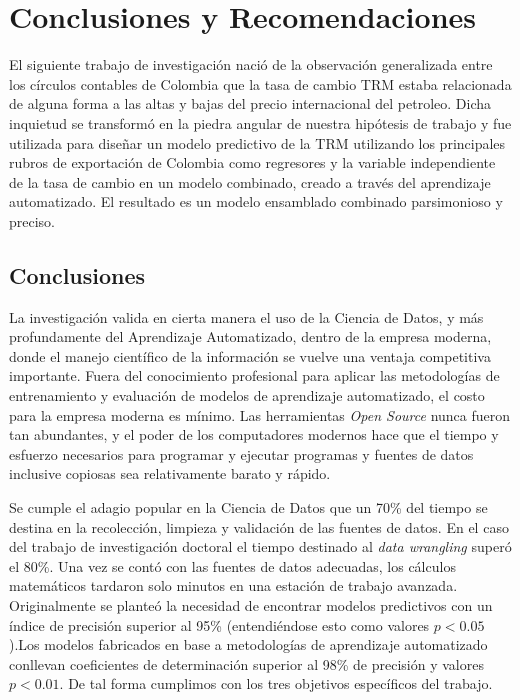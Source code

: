 \setcounter{chapter}{4}
\chapter{Conclusiones y Recomendaciones}
El siguiente trabajo de investigación nació de la observación generalizada entre los círculos contables de Colombia que la tasa de cambio TRM estaba relacionada de alguna forma a las altas y bajas del precio internacional del petroleo. Dicha inquietud se transformó en la piedra angular de nuestra hipótesis de trabajo y fue utilizada para diseñar un modelo predictivo de la TRM utilizando los principales rubros de exportación de Colombia como regresores y la variable independiente de la tasa de cambio en un modelo combinado, creado a través del aprendizaje automatizado. El resultado es un modelo ensamblado combinado parsimonioso y preciso. 

\section{Conclusiones}
La investigación valida en cierta manera el uso de la Ciencia de Datos, y más profundamente del Aprendizaje Automatizado, dentro de la empresa moderna, donde el manejo científico de la información se vuelve una ventaja competitiva importante. Fuera del conocimiento profesional para aplicar las metodologías de entrenamiento y evaluación de modelos de aprendizaje automatizado, el costo para la empresa moderna es mínimo. Las herramientas \emph{Open Source} nunca fueron tan abundantes, y el poder de los computadores modernos hace que el tiempo y esfuerzo necesarios para programar y ejecutar programas y fuentes de datos inclusive copiosas sea relativamente barato y rápido. 

Se cumple el adagio popular en la Ciencia de Datos que un 70\% del tiempo se destina en la recolección, limpieza y validación de las fuentes de datos. En el caso del trabajo de investigación doctoral el tiempo destinado al \emph{data wrangling} superó el 80\%. Una vez se contó con las fuentes de datos adecuadas, los cálculos matemáticos tardaron solo minutos en una estación de trabajo avanzada. Originalmente se planteó la necesidad de encontrar modelos predictivos con un índice de precisión superior al 95\% (entendiéndose esto como valores $p < 0.05$).Los modelos fabricados en base a metodologías de aprendizaje automatizado conllevan coeficientes de determinación superior al 98\% de precisión y valores $p < 0.01$. De tal forma cumplimos con los tres objetivos específicos del trabajo.

